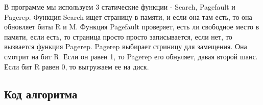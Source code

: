 В программе мы используем  3 статические функции - Search, Pagefault и Pagerep. Функция Search ищет страницу в памяти, и если она там есть, то она обновляет биты R и M. Функция Pagefault проверяет, есть ли свободное место в памяти, если есть, то страница просто просто записывается, если нет, то вызвается функция  Pagerep. Pagerep выбирает стриницу для замещения. Она смотрит на бит R. Если он равен 1, то Pagerep его обнуляет, давая второй шанс. Если бит R равен 0, то выгружаем ее на диск.
 \subsection{Код алгоритма}
 